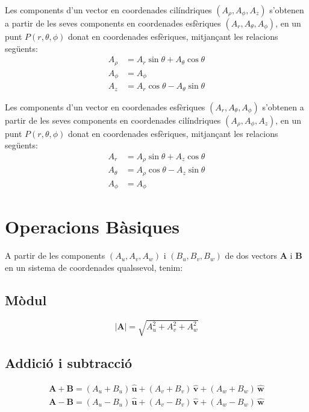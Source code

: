 \documentclass[catalan,a4paper,twoside,11pt]{article}
\begin{document}
Les components d'un vector en coordenades cilíndriques  $(A_\rho, A_\phi, A_z)$ s'obtenen a partir de les seves components en coordenades esfèriques $(A_r, A_\theta, A_\phi)$, en un punt $P(r,\theta,\phi)$ donat en coordenades esfèriques, mitjançant les relacions següents:
\begin{subequations}\begin{align}
    A_\rho &= A_r\sin\theta+A_\theta\cos\theta \\
    A_\phi &= A_\phi\\
    A_z &= A_r\cos\theta-A_\theta\sin\theta
\end{align}\end{subequations}

Les components d'un vector en coordenades esfèriques $(A_r, A_\theta, A_\phi)$ s'obtenen a partir de les seves components en coordenades cilíndriques $(A_\rho, A_\phi, A_z)$, en un punt $P(r,\theta,\phi)$ donat en coordenades esfèriques, mitjançant les relacions següents:
\begin{subequations}\begin{align}
    A_r &=  A_\rho\sin\theta+A_z\cos\theta\\
    A_\theta &=  A_\rho\cos\theta-A_z\sin\theta\\
    A_\phi &= A_\phi
\end{align}\end{subequations}


\section{Operacions  Bàsiques}
\renewcommand{\va}{\ensuremath{\,\boldsymbol{\hat{u}}}}
\renewcommand{\vb}{\ensuremath{\,\boldsymbol{\hat{v}}}}
\renewcommand{\vc}{\ensuremath{\,\boldsymbol{\hat{w}}}}

A partir de les components $(A_u,A_v,A_w)$ i $(B_u,B_v,B_w)$
de dos vectors $\boldsymbol{A}$ i $\boldsymbol{B}$ en un sistema de coordenades qualssevol, tenim:

\subsection{Mòdul}
\vspace{-5mm}
\begin{equation}
    |\boldsymbol{A}|=  \sqrt{A_u^2 + A_v^2 + A_w^2}
\end{equation}

\subsection{Addició i subtracció}
\vspace{-5mm}
\begin{subequations}\begin{align}
    \boldsymbol{A+B}= (A_u+B_u)\va + (A_v+B_v)\vb + (A_w+B_w)\vc \\
    \boldsymbol{A-B}= (A_u-B_u)\va + (A_v-B_v)\vb + (A_w-B_w)\vc
\end{align}\end{subequations}
\end{document}
